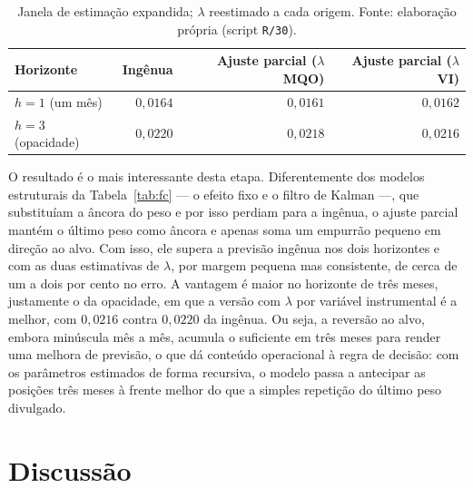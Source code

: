 \documentclass[12pt,a4paper]{article}
\begin{document}
\begin{table}[h]\centering\small
\caption{Previsão recursiva fora da amostra pelo ajuste parcial (raiz do erro quadrático médio).}
\label{tab:udecis}
\begin{tabular}{@{}lrrr@{}}
\toprule
Horizonte & Ingênua & Ajuste parcial ($\lambda$ MQO) & Ajuste parcial ($\lambda$ VI) \\
\midrule
$h=1$ (um mês)          & $0{,}0164$ & $0{,}0161$ & $0{,}0162$ \\
$h=3$ (opacidade)       & $0{,}0220$ & $0{,}0218$ & $0{,}0216$ \\
\bottomrule
\end{tabular}
\caption*{\footnotesize Janela de estimação expandida; $\lambda$ reestimado a cada origem. Fonte:
elaboração própria (script \texttt{R/30}).}
\end{table}

O resultado é o mais interessante desta etapa. Diferentemente dos modelos estruturais da
Tabela~\ref{tab:fc} --- o efeito fixo e o filtro de Kalman ---, que substituíam a âncora do peso e
por isso perdiam para a ingênua, o ajuste parcial mantém o último peso como âncora e apenas soma um
empurrão pequeno em direção ao alvo. Com isso, ele supera a previsão ingênua nos dois horizontes e
com as duas estimativas de $\lambda$, por margem pequena mas consistente, de cerca de um a dois por
cento no erro. A vantagem é maior no horizonte de três meses, justamente o da opacidade, em que a
versão com $\lambda$ por variável instrumental é a melhor, com $0{,}0216$ contra $0{,}0220$ da
ingênua. Ou seja, a reversão ao alvo, embora minúscula mês a mês, acumula o suficiente em três
meses para render uma melhora de previsão, o que dá conteúdo operacional à regra de decisão: com os
parâmetros estimados de forma recursiva, o modelo passa a antecipar as posições três meses à frente
melhor do que a simples repetição do último peso divulgado.

\section{Discussão}
\end{document}
